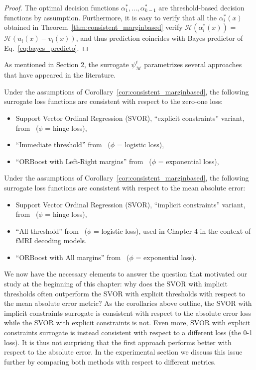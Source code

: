 \begin{proof}
The optimal decision functions $\alpha_1^*, \ldots, \alpha_{k-1}^*$ are threshold-based decision functions by assumption. Furthermore,
it is easy to verify that all the $\alpha^*_i(x)$ obtained in Theorem~\ref{thm:consistent_marginbased} verify $\mathcal{H}(\alpha_i^*(x))$ = $\mathcal{H}(u_i(x) - v_i(x))$, and thus prediction coincides with Bayes predictor of Eq.~\eqref{eq:bayes_predicto}. 
\end{proof}




As mentioned in Section 2, the surrogate $\psi_{\mathcal{M}}^{\ell}$ parametrizes several approaches that have appeared in the literature. 

\begin{corollary} Under the assumptions of Corollary~\ref{cor:consistent_marginbased}, the following surrogate loss functions are consistent with respect to the zero-one loss:
\begin{itemize}
\item Support Vector Ordinal Regression (SVOR), ``explicit constraints'' variant,  from~\citep{Shashua, Chu2007} ($\phi$ = hinge loss),
\item ``Immediate threshold'' from~\citep{Rennie} ($\phi$ = logistic loss),
\item ``ORBoost with Left-Right margins'' from~\citep{lin2006large} ($\phi$ = exponential loss),
\end{itemize}
\end{corollary}

\begin{corollary} Under the assumptions of Corollary~\ref{cor:consistent_marginbased}, the following surrogate loss functions are consistent with respect 
to the mean absolute error:
\begin{itemize}
\item Support Vector Ordinal Regression (SVOR), ``implicit constraints'' variant, from~\citep{Shashua, Chu2007} ($\phi$ = hinge loss),
\item ``All threshold'' from~\citep{Rennie} ($\phi$ = logistic loss), used in Chapter 4 in the context of fMRI decoding models.
\item ``ORBoost with All margins'' from~\citep{lin2006large} ($\phi$ = exponential loss).
\end{itemize}
\end{corollary}

We now have the necessary elements to answer the question that motivated our study at the beginning of this chapter: why does the SVOR with implicit thresholds often outperform the SVOR with explicit thresholds with respect to the mean absolute error metric? As the corollaries above outline, the SVOR with implicit constraints surrogate is consistent with respect to the absolute error loss while the SVOR with explicit constraints is not. Even more, SVOR with explicit constraints surrogate is instead consistent with respect to a different loss (the 0-1 loss). It is thus not surprising that the first approach performs better with respect to the absolute error. In the experimental section we discuss this issue further by comparing both methods with respect to different metrics.




